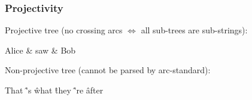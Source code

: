 \documentclass[t]{beamer}
\begin{document}
\begin{frame}
    \frametitle{Projectivity}
    Projective tree (no crossing arcs $\Leftrightarrow$ all sub-trees are sub-strings):
  \begin{center}
	\begin{dependency}
	\begin{deptext}[column sep=.7cm]
	Alice \& saw \& Bob \\
	\end{deptext}
	\end{dependency}
	\end{center}
	
	Non-projective tree (cannot be parsed by arc-standard):
  \begin{center}
    \begin{dependency}
      \begin{deptext}[column sep=1.5em,ampersand replacement=\^,font=\rmfamily]
        That \^ 's \^ what \^ they \^ 're \^ after \\
      \end{deptext}
    \end{dependency}
  \end{center}
\end{frame}
\end{document}
